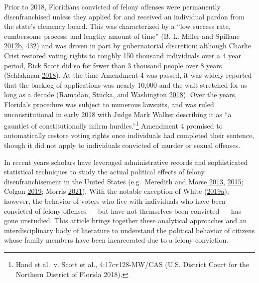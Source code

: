 \documentclass[
  12pt,
]{article}
\begin{document}
Prior to 2018, Floridians convicted of felony offenses were permanently disenfranchised unless they applied for and received an individual pardon from the state's clemency board. This was characterized by a ``low success rate, cumbersome process, and lengthy amount of time'' (B. L. Miller and Spillane \protect\hyperlink{ref-Miller2012a}{2012}\protect\hyperlink{ref-Miller2012a}{b}, 432) and was driven in part by gubernatorial discretion: although Charlie Crist restored voting rights to roughly 150 thousand individuals over a 4 year period, Rick Scott did so for fewer than 3 thousand people over 8 years (Schlakman \protect\hyperlink{ref-Schlakman2018}{2018}). At the time Amendment 4 was passed, it was widely reported that the backlog of applications was nearly 10,000 and the wait stretched for as long as a decade (Ramadan, Stucka, and Washington \protect\hyperlink{ref-Ramadan2018}{2018}). Over the years, Florida's procedure was subject to numerous lawsuits, and was ruled unconstitutional in early 2018 with Judge Mark Walker describing it as ``a gauntlet of constitutionally infirm hurdles.''\footnote{Hand et al.~v. Scott et al., 4:17cv128-MW/CAS (U.S. District Court for the Northern District of Florida 2018).} Amendment 4 promised to automatically restore voting rights once individuals had completed their sentence, though it did not apply to individuals convicted of murder or sexual offenses.

In recent years scholars have leveraged administrative records and sophisticated statistical techniques to study the actual political effects of felony disenfranchisement in the United States (e.g.~Meredith and Morse \protect\hyperlink{ref-Meredith2013}{2013}, \protect\hyperlink{ref-Meredith2015}{2015}; Colgan \protect\hyperlink{ref-Colgan2019}{2019}; Morris \protect\hyperlink{ref-Morris2021}{2021}). With the notable exception of White (\protect\hyperlink{ref-White2019a}{2019}\protect\hyperlink{ref-White2019a}{a}), however, the behavior of voters who live with individuals who have been convicted of felony offenses --- but have not themselves been convicted --- has gone unstudied. This article brings together these analytical approaches and an interdisciplinary body of literature to understand the political behavior of citizens whose family members have been incarcerated due to a felony conviction.
\end{document}
